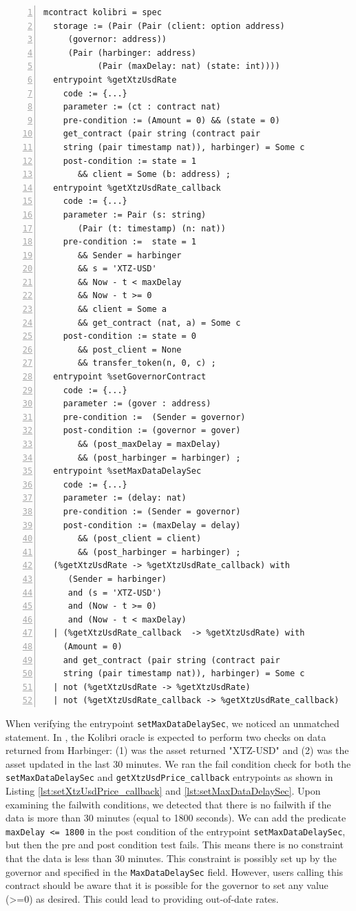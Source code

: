 \documentclass[a4paper,USenglish,cleveref, autoref,anonymous]{lipics-v2021}
\begin{document}
\begin{lstlisting}[float=tp,captionpos=b,caption={Kolibri oracle contract specification},label={lst:kolibri-contract-specification},numbers=left]
mcontract kolibri = spec 
  storage := (Pair (Pair (client: option address) 
     (governor: address))
     (Pair (harbinger: address) 
           (Pair (maxDelay: nat) (state: int))))
  entrypoint %getXtzUsdRate
    code := {...}
    parameter := (ct : contract nat) 
    pre-condition := (Amount = 0) && (state = 0)
    get_contract (pair string (contract pair 
    string (pair timestamp nat)), harbinger) = Some c
    post-condition := state = 1
       && client = Some (b: address) ;
  entrypoint %getXtzUsdRate_callback
    code := {...}
    parameter := Pair (s: string) 
       (Pair (t: timestamp) (n: nat))
    pre-condition :=  state = 1 
       && Sender = harbinger  
       && s = 'XTZ-USD' 
       && Now - t < maxDelay 
       && Now - t >= 0 
       && client = Some a 
       && get_contract (nat, a) = Some c    
    post-condition := state = 0 
       && post_client = None 
       && transfer_token(n, 0, c) ;
  entrypoint %setGovernorContract
    code := {...}
    parameter := (gover : address) 
    pre-condition :=  (Sender = governor)                  
    post-condition := (governor = gover) 
       && (post_maxDelay = maxDelay) 
       && (post_harbinger = harbinger) ;
  entrypoint %setMaxDataDelaySec
    code := {...}
    parameter := (delay: nat)
    pre-condition := (Sender = governor)             
    post-condition := (maxDelay = delay) 
       && (post_client = client) 
       && (post_harbinger = harbinger) ;
  (%getXtzUsdRate -> %getXtzUsdRate_callback) with
     (Sender = harbinger)
     and (s = 'XTZ-USD') 
     and (Now - t >= 0)  
     and (Now - t < maxDelay)  
  | (%getXtzUsdRate_callback  -> %getXtzUsdRate) with 
    (Amount = 0) 
    and get_contract (pair string (contract pair 
    string (pair timestamp nat)), harbinger) = Some c
  | not (%getXtzUsdRate -> %getXtzUsdRate) 
  | not (%getXtzUsdRate_callback -> %getXtzUsdRate_callback)
\end{lstlisting}
When verifying the entrypoint \lstinline/setMaxDataDelaySec/, we noticed an unmatched statement. In \cite{kolibri}, the Kolibri oracle is expected to perform two checks on data returned from Harbinger: (1) was the asset returned "XTZ-USD" and (2) was the asset updated in the last 30 minutes. We ran the fail condition check for both the \lstinline/setMaxDataDelaySec/ and \lstinline/getXtzUsdPrice_callback/ entrypoints as shown in Listing \ref{lst:setXtzUsdPrice_callback} and \ref{lst:setMaxDataDelaySec}. Upon examining the failwith conditions, we detected that there is no failwith if the data is more than 30 minutes (equal to 1800 seconds). We can add the predicate \lstinline/maxDelay <= 1800/ in the post condition of the entrypoint \lstinline/setMaxDataDelaySec/, but then the pre and post condition test fails. This means there is no constraint that the data is less than 30 minutes. This constraint is possibly set up by the governor and specified in the \lstinline/MaxDataDelaySec/ field. However, users calling this contract should be aware that it is possible for the governor to set any value (>=0) as desired. This could lead to providing out-of-date rates.
\end{document}
